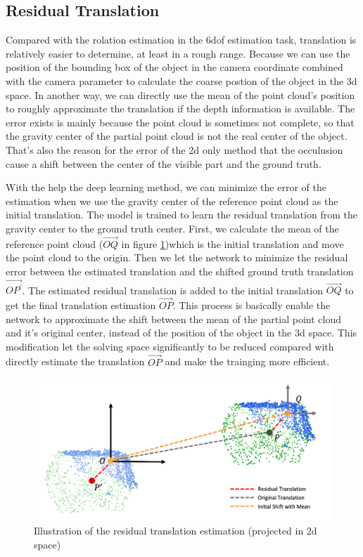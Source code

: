 \documentclass[12pt,DIV14,BCOR12mm,a4paper,footinclude=false,headinclude,parskip=half-,twoside,openright,cleardoublepage=empty,toc=index,bibliography=totoc,listof=totoc]{scrreprt}
\numberwithin{equation}{chapter}
\begin{document}
\subsection{Residual Translation}
Compared with the rolation estimation in the \gls{6dof} estimation task, translation is relatively easier to determine, at least in a rough range. Because we can use the position of the bounding box of the object in the camera coordinate combined with the camera parameter to calculate the coarse postion of the object in the \gls{3d} space. In another way, we can directly use the mean of the point cloud's position to roughly approximate the translation if the depth information is available. The error exists is mainly because the point cloud is sometimes not complete, so that the gravity center of the partial point cloud is not the real center of the object. That's also the reason for the error of the \gls{2d} only method that the occulusion cause a shift between the center of the visible part and the ground truth.

With the help the deep learning method, we can minimize the error of the estimation when we use the gravity center of the reference point cloud as the initial translation. The model is trained to learn the residual translation from the gravity center to the ground truth center. First, we calculate the mean of the reference point cloud ($\overrightarrow{OQ}$ in figure \ref{img:res_t})which is the initial translation and move the point cloud to the origin. Then we let the network to minimize the residual error between the estimated translation and the shifted ground truth translation $\overrightarrow{OP^{'}}$. The estimated residual translation is added to the initial translation $\overrightarrow{OQ}$ to get the final translation estimation $\overrightarrow{OP} $. This process is basically enable the network to approximate the shift between the mean of the partial point cloud and it's original center, instead of the position of the object in the \gls{3d} space. This modification let the solving space significantly to be reduced compared with directly estimate the translation $\overrightarrow{OP} $ and make the trainging more efficient.

\begin{figure}[h]
	\centering
	\includegraphics[scale=.22]{img/res_t.png}
	\caption{Illustration of the residual translation estimation (projected in \gls{2d} space)}
	\label{img:res_t}
\end{figure}
\end{document}
